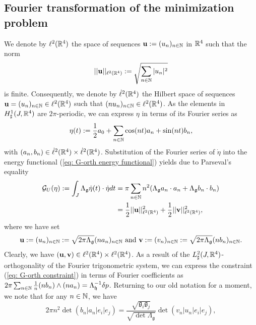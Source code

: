 \subsection{Fourier transformation of the minimization problem}
We denote by $\ell^2(\mathbb{R}^4)$ the space of sequences $\mathbf{u} := (u_n)_{n \in \mathbb{N}}$ in $\mathbb{R}^4$ such that the norm
\begin{equation}
	||\mathbf{u}||_{\ell^2(\mathbb{R}^4)} := \sqrt{ \sum_{n \in \mathbb{N}} |u_n|^2 }
\end{equation}
is finite. Consequently, we denote by $\dot{\ell}^2(\mathbb{R}^4)$ the Hilbert space of sequences $\mathbf{u} = (u_n)_{n \in \mathbb{N}} \in \ell^2(\mathbb{R}^4)$ such that $(n u_n)_{n \in \mathbb{N}} \in \ell^2(\mathbb{R}^4)$. As the elements in $H_{\sharp}^{1}(J, \mathbb{R}^4)$ are $2\pi$-periodic, we can express $\eta$ in terms of its Fourier series as
\begin{equation}
\eta(t) := \frac{1}{2} a_0 + \sum_{n \in \mathbb{N}} \cos(nt) a_n + \sin(n t) b_n,
\end{equation}
with $(a_n, b_n) \in \dot{\ell}^2(\mathbb{R}^4) \times \dot{\ell}^2(\mathbb{R}^4)$. Substitution of the Fourier series of $\dot{\eta}$ into the energy functional (\ref{eq: G-orth energy functional}) yields due to Parseval's equality
\begin{align}
\mathcal{G}_{U} (\eta) := \int_{J} \Lambda_{\mathfrak{g}} \dot{\eta}(t) \cdot \dot{\eta} dt &= \pi \sum_{n  \in \mathbb{N}} n^2(\Lambda_{\mathfrak{g}} a_n \cdot a_n + \Lambda_{\mathfrak{g}} b_n \cdot b_n)  \\  &=
\frac{1}{2} ||\mathbf{u}||_{\ell^2(\mathbb{R}^4)}^2 + \frac{1}{2} ||\mathbf{v}||_{\ell^2(\mathbb{R}^4)}^2,
\end{align}
where we have set
\begin{align}
\label{eq:relation Fourier coeffs of eta}
	\mathbf{u} := (u_n)_{n \in \mathbb{N}} := \sqrt{2 \pi \Lambda_{\mathfrak{g}}}(n a_n)_{n \in \mathbb{N}} \text{ and } \mathbf{v} := (v_n)_{n \in \mathbb{N}} := \sqrt{2 \pi \Lambda_{\mathfrak{g}}} (n b_n)_{n \in \mathbb{N}}.
\end{align}
Clearly, we have $(\mathbf{u}, \mathbf{v}) \in \ell^2(\mathbb{R}^4) \times \ell^2(\mathbb{R}^4)$. As a result of the $L_{\sharp}^2(J, \mathbb{R}^4)$-orthogonality of the Fourier trigonometric system, we can express the constraint (\ref{eq: G-orth constraint}) in terms of Fourier coefficients as $2 \pi \sum_{n \in \mathbb{N}} \tfrac{1}{n} (nb_n) \wedge (n a_n) = \Lambda_{\mathfrak{h}}^{-1} \delta p$. Returning to our old notation for a moment, we note that for any $n \in \mathbb{N}$, we have
\begin{equation}
2 \pi n^2 \det(b_n | a_n | e_i | e_j) = \frac{\sqrt{\mathfrak{g}_i \mathfrak{g}_j}}{\sqrt{\det \Lambda_{\mathfrak{g}}}} \det(v_n | u_n |e_i | e_j),
\end{equation}
